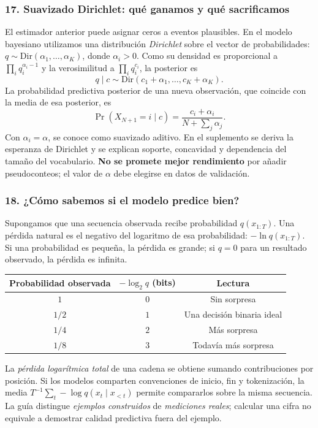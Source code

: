 \subsubsection*{17. Suavizado Dirichlet: qué ganamos y qué sacrificamos}
El estimador anterior puede asignar ceros a eventos plausibles. En el modelo bayesiano utilizamos una distribución \emph{Dirichlet} sobre el vector de probabilidades: $q\sim\mathrm{Dir}(\alpha_1,\ldots,\alpha_K)$, donde $\alpha_i>0$. Como su densidad es proporcional a $\prod_iq_i^{\alpha_i-1}$ y la verosimilitud a $\prod_iq_i^{c_i}$, la posterior es
\[
q\mid c\sim\mathrm{Dir}(c_1+\alpha_1,\ldots,c_K+\alpha_K).
\]
La probabilidad predictiva posterior de una nueva observación, que coincide con la media de esa posterior, es
\[
\boxed{\Pr(X_{N+1}=i\mid c)=\frac{c_i+\alpha_i}{N+\sum_j\alpha_j}.}
\]
Con $\alpha_i=\alpha$, se conoce como suavizado aditivo. En el suplemento se deriva la esperanza de Dirichlet y se explican soporte, concavidad y dependencia del tamaño del vocabulario. \textbf{No se promete mejor rendimiento} por añadir pseudoconteos; el valor de $\alpha$ debe elegirse en datos de validación.

\subsubsection*{18. ¿Cómo sabemos si el modelo predice bien?}
Supongamos que una secuencia observada recibe probabilidad $q(x_{1:T})$. Una pérdida natural es el negativo del logaritmo de esa probabilidad: $-\ln q(x_{1:T})$. Si una probabilidad es pequeña, la pérdida es grande; si $q=0$ para un resultado observado, la pérdida es infinita.
\begin{center}
\begin{tabular}{c|c|c}\toprule
Probabilidad observada & $-\log_2q$ (bits) & Lectura\\\midrule
$1$ & $0$ & Sin sorpresa\\
$1/2$ & $1$ & Una decisión binaria ideal\\
$1/4$ & $2$ & Más sorpresa\\
$1/8$ & $3$ & Todavía más sorpresa\\\bottomrule
\end{tabular}
\end{center}
La \emph{pérdida logarítmica total} de una cadena se obtiene sumando contribuciones por posición. Si los modelos comparten convenciones de inicio, fin y tokenización, la media $T^{-1}\sum_t-\log q(x_t\mid x_{<t})$ permite compararlos sobre la misma secuencia. La guía distingue \emph{ejemplos construidos} de \emph{mediciones reales}; calcular una cifra no equivale a demostrar calidad predictiva fuera del ejemplo.

